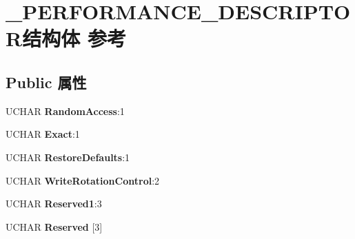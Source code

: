 \hypertarget{struct___p_e_r_f_o_r_m_a_n_c_e___d_e_s_c_r_i_p_t_o_r}{}\section{\+\_\+\+P\+E\+R\+F\+O\+R\+M\+A\+N\+C\+E\+\_\+\+D\+E\+S\+C\+R\+I\+P\+T\+O\+R结构体 参考}
\label{struct___p_e_r_f_o_r_m_a_n_c_e___d_e_s_c_r_i_p_t_o_r}
\subsection*{Public 属性}
\begin{DoxyCompactItemize}
\item 
\mbox{\label{struct___p_e_r_f_o_r_m_a_n_c_e___d_e_s_c_r_i_p_t_o_r_ac1cd1fdd8730a1e0124a970ad23a9a5c}} 
U\+C\+H\+AR {\bfseries Random\+Access}\+:1
\item 
\mbox{\label{struct___p_e_r_f_o_r_m_a_n_c_e___d_e_s_c_r_i_p_t_o_r_aab49422061b8f65452b6d6caa8dd3557}} 
U\+C\+H\+AR {\bfseries Exact}\+:1
\item 
\mbox{\label{struct___p_e_r_f_o_r_m_a_n_c_e___d_e_s_c_r_i_p_t_o_r_a2c602dc2d4e55719b91eeee5f58d3bd7}} 
U\+C\+H\+AR {\bfseries Restore\+Defaults}\+:1
\item 
\mbox{\label{struct___p_e_r_f_o_r_m_a_n_c_e___d_e_s_c_r_i_p_t_o_r_a245963f870b85974f65d7c04fa25bc48}} 
U\+C\+H\+AR {\bfseries Write\+Rotation\+Control}\+:2
\item 
\mbox{\label{struct___p_e_r_f_o_r_m_a_n_c_e___d_e_s_c_r_i_p_t_o_r_a6ae9494d1b5d7486b3a2888a7f035d34}} 
U\+C\+H\+AR {\bfseries Reserved1}\+:3
\item 
\mbox{\label{struct___p_e_r_f_o_r_m_a_n_c_e___d_e_s_c_r_i_p_t_o_r_a29477adbbbac398f5ec98aeecb007010}} 
U\+C\+H\+AR {\bfseries Reserved} \mbox{[}3\mbox{]}
\item 

\end{DoxyCompactItemize}
